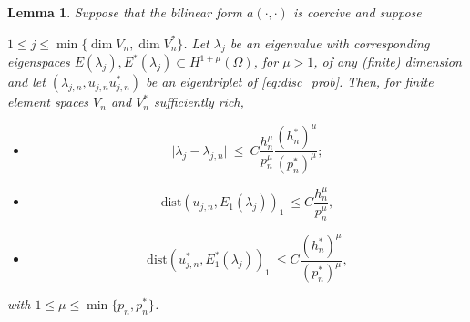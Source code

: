 \documentclass[preprint,12pt]{elsarticle}
\newtheorem{lemma}[theorem]{Lemma}
\begin{document}
\begin{lemma}
\label{lm:adj}
Suppose  that the bilinear form $a(\cdot,\cdot)$ is coercive and suppose

$ 1 \leq j\leq \min\{\dim V_n,\dim V_n^*\}$. Let
$\lambda_j$ be an eigenvalue with
corresponding eigenspaces $E(\lambda_j),E^*(\lambda_j)\subset H^{1+\mu}(\Omega)$, for $\mu>1$, of any (finite) dimension  and
let $(\lambda_{j,n},u_{j,n}u_{j,n}^*)$ be an  eigentriplet  of \eqref{eq:disc_prob}.
Then, for finite element spaces $V_n$ and $V_n^*$ sufficiently rich,
\begin{itemize}
\item[(i)] 
\begin{equation}\label{eq:supereig}
\vert \lambda_j - \lambda_{j,n} \vert \ \leq \ C
\frac{h_n^{\mu} }{p_n^{\mu}}\frac{(h_n^*)^{\mu} }{(p_n^*)^{\mu}};  
\end{equation}
\item[(ii)] 
\begin{equation}
\label{eq:energy} \mathrm{dist}(
u_{j,n},E_1(\lambda_j))_{1} \ \leq
C \frac{h_n^{\mu}}{p_n^{\mu}}, 
\end{equation}
\item[(iii)]
\begin{equation}
\label{eq:energy_dual} \mathrm{dist}(
u_{j,n}^*,E_1^*(\lambda_j))_{1} \ \leq
C \frac{(h_n^*)^{\mu}}{(p_n^*)^{\mu}}, 
\end{equation}
\end{itemize}
with $1\leq \mu\leq \min\{p_n,p_n^*\}$.
\end{lemma}
\end{document}
